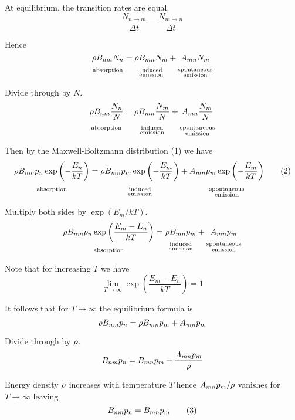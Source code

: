 \documentclass[12pt]{article}
\begin{document}
\bigskip
At equilibrium, the transition rates are equal.
\begin{equation*}
\frac{N_{n\rightarrow m}}{\Delta t}=\frac{N_{m\rightarrow n}}{\Delta t}
\end{equation*}

Hence
\begin{equation*}
\underset{\ABSORPTION}{\RHO\BNM N_n}
=\underset{\INDUCED}{\RHO\BMN N_m}
+\underset{\SPONTANEOUS}{\AMN N_m}
\end{equation*}

Divide through by $N$.
\begin{equation*}
\underset{\ABSORPTION}{\RHO\BNM \frac{N_n}{N}}
=\underset{\INDUCED}{\RHO\BMN \frac{N_m}{N}}
+\underset{\SPONTANEOUS}{\AMN \frac{N_m}{N}}
\end{equation*}

Then by the Maxwell-Boltzmann distribution (1) we have
\begin{equation*}
\underset{\ABSORPTION}{\RHO\BNM p_n\exp\left(-\frac{E_n}{kT}\right)}
=\underset{\INDUCED}{\RHO\BMN p_m\exp\left(-\frac{E_m}{kT}\right)}
+\underset{\SPONTANEOUS}{\AMN p_m\exp\left(-\frac{E_m}{kT}\right)}
\tag{2}
\end{equation*}

Multiply both sides by $\exp(E_m/kT)$.
\begin{equation*}
\underset{\ABSORPTION}{\RHO\BNM p_n\exp\left(\frac{E_m-E_n}{kT}\right)}
=\underset{\INDUCED}{\RHO\BMN p_m}
+\underset{\SPONTANEOUS}{\AMN p_m}
\end{equation*}

Note that for increasing $T$ we have
\begin{equation*}
\lim_{T\rightarrow\infty}\exp\left(\frac{E_m-E_n}{kT}\right)=1
\end{equation*}

It follows that for $T\rightarrow\infty$ the equilibrium formula is
\begin{equation*}
\rho B_{nm} p_n
=\rho B_{mn} p_m
+A_{mn} p_m
\end{equation*}

Divide through by $\rho$.
\begin{equation*}
B_{nm} p_n=B_{mn} p_m+\frac{A_{mn} p_m}{\rho}
\end{equation*}

Energy density $\rho$ increases with temperature $T$
hence $A_{mn} p_m/\rho$ vanishes for $T\rightarrow\infty$ leaving
\begin{equation*}
B_{nm} p_n=B_{mn} p_m
\tag{3}
\end{equation*}
\end{document}
